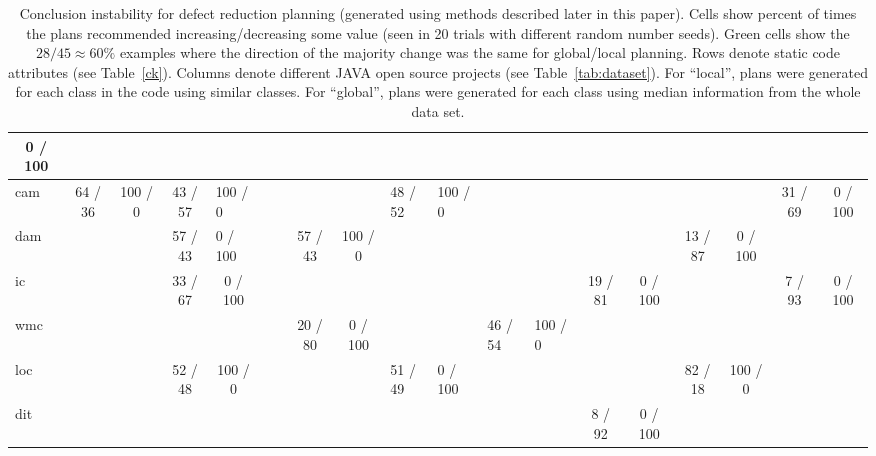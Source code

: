 \begin{table}[t!]
\begin{tabular}{|l@{~}|l@{~}|l@{~}|l@{~}|l@{~}|l@{~}|l@{~}|l@{~}|l@{~}|l@{~}|l@{~}|l@{~}|l@{~}|l@{~}|l@{~}|l@{~}|l@{~}|l@{~}|l@{~}|}
  \multicolumn{1}{c|}{\cellcolor[HTML]{B7E1CD}0 / 100} &
   &
   \\ \hline
cam &
  \multicolumn{1}{c|}{\cellcolor[HTML]{B7E1CD}64 / 36} &
  \multicolumn{1}{c|}{\cellcolor[HTML]{B7E1CD}100 / 0} &
  \multicolumn{1}{c|}{43 / 57} &
  100 / 0 &
   &
   &
   &
   &
  48 / 52 &
  100 / 0 &
   &
   &
   &
   &
   &
   &
  \multicolumn{1}{c|}{\cellcolor[HTML]{B7E1CD}31 / 69} &
  \multicolumn{1}{c|}{\cellcolor[HTML]{B7E1CD}0 / 100} \\ \hline
dam &
   &
   &
  \multicolumn{1}{c|}{57 / 43} &
  0 / 100 &
   &
   &
  \multicolumn{1}{c|}{\cellcolor[HTML]{B7E1CD}57 / 43} &
  \multicolumn{1}{c|}{\cellcolor[HTML]{B7E1CD}100 / 0} &
   &
   &
   &
   &
   &
   &
  \multicolumn{1}{c|}{\cellcolor[HTML]{B7E1CD}13 / 87} &
  \multicolumn{1}{c|}{\cellcolor[HTML]{B7E1CD}0 / 100} &
   &
   \\ \hline
ic &
   &
   &
  \multicolumn{1}{c|}{\cellcolor[HTML]{B7E1CD}33 / 67} &
  \multicolumn{1}{c|}{\cellcolor[HTML]{B7E1CD}0 / 100} &
   &
   &
   &
   &
   &
   &
   &
   &
  \multicolumn{1}{c|}{\cellcolor[HTML]{B7E1CD}19 / 81} &
  \multicolumn{1}{c|}{\cellcolor[HTML]{B7E1CD}0 / 100} &
   &
   &
  \multicolumn{1}{c|}{\cellcolor[HTML]{B7E1CD}7 / 93} &
  \multicolumn{1}{c|}{\cellcolor[HTML]{B7E1CD}0 / 100} \\ \hline
wmc &
   &
   &
   &
   &
   &
   &
  \multicolumn{1}{c|}{\cellcolor[HTML]{B7E1CD}20 / 80} &
  \multicolumn{1}{c|}{\cellcolor[HTML]{B7E1CD}0 / 100} &
   &
   &
  46 / 54 &
  100 / 0 &
   &
   &
   &
   &
   &
   \\ \hline
loc &
   &
   &
  \multicolumn{1}{c|}{\cellcolor[HTML]{B7E1CD}52 / 48} &
  \multicolumn{1}{c|}{\cellcolor[HTML]{B7E1CD}100 / 0} &
   &
   &
   &
   &
  51 / 49 &
  0 / 100 &
   &
   &
   &
   &
  \multicolumn{1}{c|}{\cellcolor[HTML]{B7E1CD}82 / 18} &
  \multicolumn{1}{c|}{\cellcolor[HTML]{B7E1CD}100 / 0} &
   &
   \\ \hline
dit &
   &
   &
   &
   &
   &
   &
   &
   &
   &
   &
   &
   &
  \multicolumn{1}{c|}{\cellcolor[HTML]{B7E1CD}8 / 92} &
  \multicolumn{1}{c|}{\cellcolor[HTML]{B7E1CD}0 / 100} &
   &
   &
   &
   \\ \hline
\end{tabular}
\caption{Conclusion instability for defect reduction planning 
(generated using methods described later in this paper). 
Cells show  percent of times the plans recommended  increasing/decreasing some value
(seen in  20 trials
with   different random number seeds).    
Green cells show
  the  $28/45 \approx 60\%$   examples 
    where  the direction of the    majority change  was the same for global/local planning.
  Rows denote static code attributes (see Table~\ref{ck}).
  Columns denote different JAVA open source projects (see Table~\ref{tab:dataset}).
  For ``local'', plans were generated for each class in the code using similar classes.
  For ``global'', plans were generated for each class using median information from the whole data set. 
 }
\label{tab:tend}
\end{table}
 
